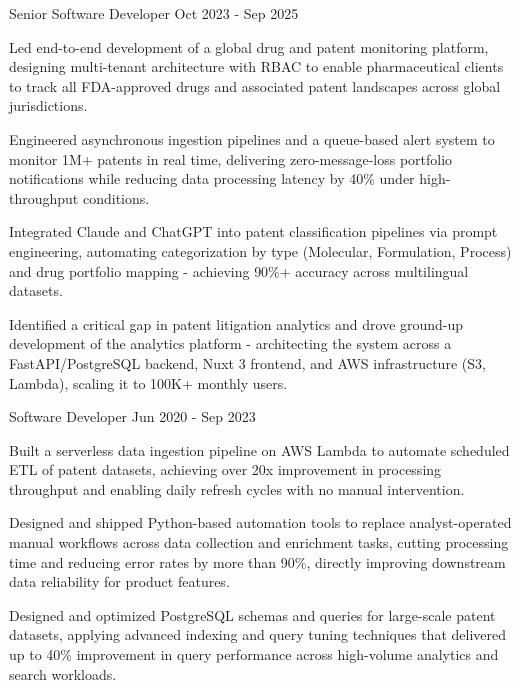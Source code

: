 \documentclass[11pt, a4paper]{awesome-cv}
\begin{document}
\begin{cventries}
\cventry
    {Senior Software Developer} %
    {} %
    {} %
    {Oct 2023 - Sep 2025} %
    {
      \begin{cvitems}
        \item {Led end-to-end development of a global drug and patent monitoring platform, designing multi-tenant architecture with RBAC to enable pharmaceutical clients to track all FDA-approved drugs and associated patent landscapes across global jurisdictions.}
        \item {Engineered asynchronous ingestion pipelines and a queue-based alert system to monitor 1M+ patents in real time, delivering zero-message-loss portfolio notifications while reducing data processing latency by 40\% under high-throughput conditions.}
        \item {Integrated Claude and ChatGPT into patent classification pipelines via prompt engineering, automating categorization by type (Molecular, Formulation, Process) and drug portfolio mapping - achieving 90\%+ accuracy across multilingual datasets.}
        \item {Identified a critical gap in patent litigation analytics and drove ground-up development of the analytics platform - architecting the system across a FastAPI/PostgreSQL backend, Nuxt 3 frontend, and AWS infrastructure (S3, Lambda), scaling it to 100K+ monthly users.}
      \end{cvitems}
    }

\vspace{0.4cm}  %

\cventry
    {Software Developer} %
    {} %
    {} %
    {Jun 2020 - Sep 2023} %
    {
      \begin{cvitems}
        \item {Built a serverless data ingestion pipeline on AWS Lambda to automate scheduled ETL of patent datasets, achieving over 20x improvement in processing throughput and enabling daily refresh cycles with no manual intervention.}
        \item {Designed and shipped Python-based automation tools to replace analyst-operated manual workflows across data collection and enrichment tasks, cutting processing time and reducing error rates by more than 90\%, directly improving downstream data reliability for product features.}
        \item {Designed and optimized PostgreSQL schemas and queries for large-scale patent datasets, applying advanced indexing and query tuning techniques that delivered up to 40\% improvement in query performance across high-volume analytics and search workloads.}
      \end{cvitems}
    }


\end{cventries}
\end{document}
